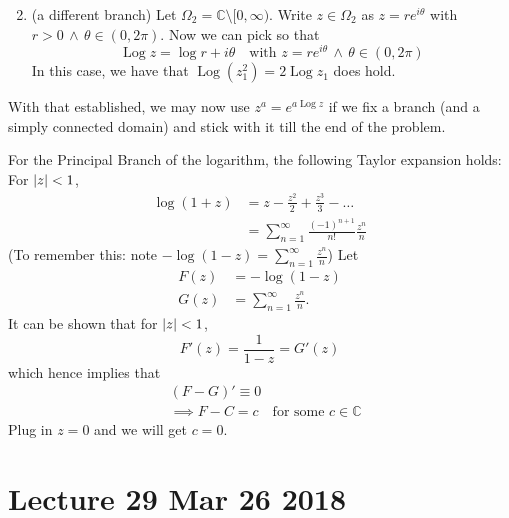 \documentclass[notoc,notitlepage]{tufte-book}
\DeclareMathOperator{\Log}{Log}
\begin{document}
\begin{enumerate}
  \setcounter{enumi}{1}
  \item (a different branch) Let $\Omega_2 = \mathbb{C} \setminus [0, \infty)$. Write $z \in \Omega_2$ as $z = re^{i \theta}$ with $r > 0 \, \land \, \theta \in (0, 2 \pi)$. Now we can pick  so that
  \begin{equation*}
    \Log z = \log r + i \theta \quad \text{with } z = re^{i \theta} \, \land \, \theta \in (0, 2\pi)
  \end{equation*}
  In this case, we have that $\Log (z_1^2) = 2 \Log z_1$ does hold.
\end{enumerate}

With that established, we may now use $z^a = e^{a \Log z}$ if we fix a branch (and a simply connected domain) and stick with it till the end of the problem.

\begin{remark}
  For the Principal Branch of the logarithm, the following Taylor expansion holds: \\
  For $\left|z\right| < 1$,
  \begin{align*}
    \log (1 + z) &= z - \frac{z^2}{2} + \frac{z^3}{3} - \hdots \\
      &= \sum_{n=1}^{\infty} \frac{(-1)^{n + 1}}{n!} \frac{z^n}{n}
  \end{align*}
  (To remember this: note $- \log (1 - z) = \sum_{n=1}^{\infty} \frac{z^n}{n}$)
  Let
  \begin{align*}
    F(z) &= - \log (1 - z) \\
    G(z) &= \sum_{n=1}^{\infty} \frac{z^n}{n}.
  \end{align*}
  It can be shown that for $\left|z\right| < 1$,
  \begin{equation*}
    F'(z) = \frac{1}{1 - z} = G'(z)
  \end{equation*}
  which hence implies that
  \begin{align*}
    &(F - G)' \equiv 0 \\
    &\implies F - C = c \quad \text{for some } c \in \mathbb{C}
  \end{align*}
  Plug in $z = 0$ and we will get $c = 0$.
\end{remark}



\chapter{Lecture 29 Mar 26 2018}
  \label{chapter:lecture_29_mar_26_2018}
\end{document}
